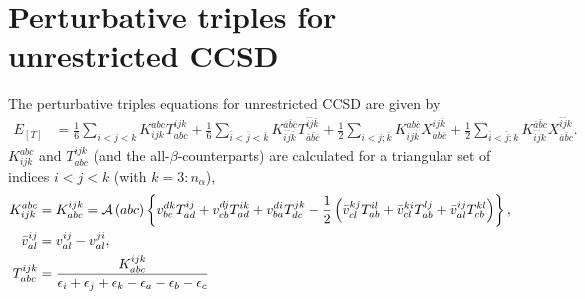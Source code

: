 \documentclass[a4paper,12pt,oneside]{book}
\newcommand{\half}{\frac{1}{2}}
\newcommand{\asop}[1]{{\cal A}\left(#1\right)}
\newcommand{\spa}[1]{{#1}}
\newcommand{\spb}[1]{\bar{#1}}
\begin{document}
\section{Perturbative triples for unrestricted CCSD}
The perturbative triples equations for unrestricted CCSD are given by
\begin{equation}
\begin{aligned}
E_{[T]} &= \frac{1}{6}\sum_{\spa{i}\lt \spa{j}\lt \spa{k}} K^{\spa{a}\spa{b}\spa{c}}_{\spa{i}\spa{j}\spa{k}} T_{\spa{a}\spa{b}\spa{c}}^{\spa{i}\spa{j}\spa{k}}
+\frac{1}{6}\sum_{\spb{i}\lt \spb{j}\lt \spb{k}} K^{\spb{a}\spb{b}\spb{c}}_{\spb{i}\spb{j}\spb{k}} T_{\spb{a}\spb{b}\spb{c}}^{\spb{i}\spb{j}\spb{k}} 
+\frac{1}{2}\sum_{\spa{i}\lt \spa{j}; \spb{k}} K^{\spa{a}\spa{b}\spb{c}}_{\spa{i}\spa{j}\spb{k}} X_{\spa{a}\spa{b}\spb{c}}^{\spa{i}\spa{j}\spb{k}}
+\frac{1}{2}\sum_{\spb{i}\lt \spb{j}; \spa{k}} K^{\spb{a}\spb{b}\spa{c}}_{\spb{i}\spb{j}\spa{k}} X_{\spb{a}\spb{b}\spa{c}}^{\spb{i}\spb{j}\spa{k}}.
\end{aligned}
\end{equation}
$K^{\spa{a}\spa{b}\spa{c}}_{\spa{i}\spa{j}\spa{k}}$ and $T_{\spa{a}\spa{b}\spa{c}}^{\spa{i}\spa{j}\spa{k}}$ (and the all-$\beta$-counterparts) 
are calculated for a triangular set of indices $\spa{i}\lt \spa{j}\lt \spa{k}$ 
(with $\spa{k}=3:n_\alpha$),
\begin{equation}
\begin{aligned}
K^{\spa{a}\spa{b}\spa{c}}_{\spa{i}\spa{j}\spa{k}} &= K_{\spa{a}\spa{b}\spa{c}}^{\spa{i}\spa{j}\spa{k}}
= \asop{\spa{a}\spa{b}\spa{c}} \left\{ 
  v_{\spa{b}\spa{c}}^{\spa{d}\spa{k}} T^{\spa{i}\spa{j}}_{\spa{a}\spa{d}}
+ v_{\spa{c}\spa{b}}^{\spa{d}\spa{j}} T^{\spa{i}\spa{k}}_{\spa{a}\spa{d}}
+ v_{\spa{b}\spa{a}}^{\spa{d}\spa{i}} T^{\spa{j}\spa{k}}_{\spa{d}\spa{c}}
- \half\left(\bar v_{\spa{c}\spa{l}}^{\spa{k}\spa{j}} T^{\spa{i}\spa{l}}_{\spa{a}\spa{b}}
+ \bar v_{\spa{c}\spa{l}}^{\spa{k}\spa{i}} T^{\spa{l}\spa{j}}_{\spa{a}\spa{b}}
+ \bar v_{\spa{a}\spa{l}}^{\spa{i}\spa{j}} T^{\spa{k}\spa{l}}_{\spa{c}\spa{b}}
\right)
\right\},\\
\bar v_{\spa{a}\spa{l}}^{\spa{i}\spa{j}} &= v_{\spa{a}\spa{l}}^{\spa{i}\spa{j}} - v_{\spa{a}\spa{l}}^{\spa{j}\spa{i}},\\
T_{\spa{a}\spa{b}\spa{c}}^{\spa{i}\spa{j}\spa{k}} &= 
\frac{K_{\spa{a}\spa{b}\spa{c}}^{\spa{i}\spa{j}\spa{k}}}
{\epsilon_{\spa{i}} +\epsilon_{\spa{j}} +\epsilon_{\spa{k}} -\epsilon_{\spa{a}} -\epsilon_{\spa{b}} -\epsilon_{\spa{c}}}
\end{aligned}
\end{equation}
\end{document}
